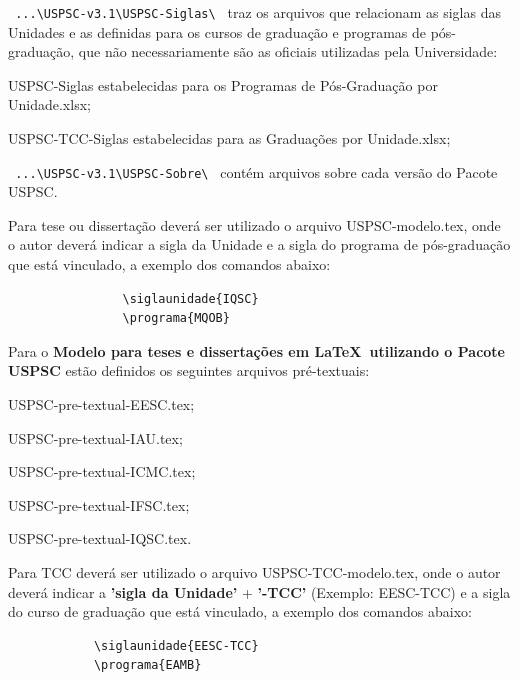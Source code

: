 \begin{alineas}
	\item \verb+ ...\USPSC-v3.1\USPSC-Siglas\ + traz os arquivos que relacionam as siglas das Unidades e as definidas para os cursos de gradua\c{c}\~ao e programas de p\'os-gradua\c{c}\~ao, que n\~ao necessariamente s\~ao as oficiais utilizadas pela Universidade: 
		\begin{alineas}	
			\item USPSC-Siglas estabelecidas para os Programas de P\'os-Gradua\c{c}\~ao por Unidade.xlsx;
			\item USPSC-TCC-Siglas estabelecidas para as Gradua\c{c}\~oes por Unidade.xlsx;
		\end{alineas}
		
	\item \verb+ ...\USPSC-v3.1\USPSC-Sobre\ + cont\'em arquivos sobre cada vers\~ao do Pacote USPSC.

\end{alineas}	 

		
Para tese ou disserta\c{c}\~ao dever\'a ser utilizado o arquivo USPSC-modelo.tex, onde o autor dever\'a indicar a sigla da Unidade e a sigla do programa de p\'os-gradua\c{c}\~ao que est\'a vinculado, a exemplo dos comandos abaixo:
		
			\begin{verbatim}
				\siglaunidade{IQSC}
				\programa{MQOB}
			\end{verbatim}
			
Para o \textbf{Modelo para teses e disserta\c{c}\~oes em \LaTeX\ utilizando o Pacote USPSC} est\~ao definidos os seguintes arquivos pr\'e-textuais:
			
			\begin{alineas}	 
				\item USPSC-pre-textual-EESC.tex;
				\item USPSC-pre-textual-IAU.tex;
				\item USPSC-pre-textual-ICMC.tex;
				\item USPSC-pre-textual-IFSC.tex;
				\item USPSC-pre-textual-IQSC.tex.
			\end{alineas}
			
Para TCC dever\'a ser utilizado o arquivo USPSC-TCC-modelo.tex, onde o autor dever\'a indicar a \textbf{'sigla da Unidade'} + \textbf{'-TCC'} (Exemplo: EESC-TCC) e a sigla do curso de gradua\c{c}\~ao que est\'a vinculado, a exemplo dos comandos abaixo:
			
			\begin{verbatim}
			\siglaunidade{EESC-TCC}
			\programa{EAMB}
			\end{verbatim}
			
